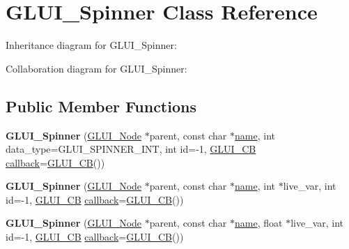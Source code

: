 \hypertarget{class_g_l_u_i___spinner}{\section{G\+L\+U\+I\+\_\+\+Spinner Class Reference}
\label{class_g_l_u_i___spinner}
}


Inheritance diagram for G\+L\+U\+I\+\_\+\+Spinner\+:


Collaboration diagram for G\+L\+U\+I\+\_\+\+Spinner\+:
\subsection*{Public Member Functions}
\begin{DoxyCompactItemize}
\item 
\hypertarget{class_g_l_u_i___spinner_a7a0a9950bfea2df037b2f13b21585d7b}{{\bfseries G\+L\+U\+I\+\_\+\+Spinner} (\hyperlink{class_g_l_u_i___node}{G\+L\+U\+I\+\_\+\+Node} $\ast$parent, const char $\ast$\hyperlink{class_g_l_u_i___control_aa95b97d50df45335fc33f0af03958eb3}{name}, int data\+\_\+type=G\+L\+U\+I\+\_\+\+S\+P\+I\+N\+N\+E\+R\+\_\+\+I\+N\+T, int id=-\/1, \hyperlink{class_g_l_u_i___c_b}{G\+L\+U\+I\+\_\+\+C\+B} \hyperlink{class_g_l_u_i___control_a96060fe0cc6d537e736dd6eef78e24ab}{callback}=\hyperlink{class_g_l_u_i___c_b}{G\+L\+U\+I\+\_\+\+C\+B}())}\label{class_g_l_u_i___spinner_a7a0a9950bfea2df037b2f13b21585d7b}

\item 
\hypertarget{class_g_l_u_i___spinner_afdb231b113e73b8714a36effcc9edf94}{{\bfseries G\+L\+U\+I\+\_\+\+Spinner} (\hyperlink{class_g_l_u_i___node}{G\+L\+U\+I\+\_\+\+Node} $\ast$parent, const char $\ast$\hyperlink{class_g_l_u_i___control_aa95b97d50df45335fc33f0af03958eb3}{name}, int $\ast$live\+\_\+var, int id=-\/1, \hyperlink{class_g_l_u_i___c_b}{G\+L\+U\+I\+\_\+\+C\+B} \hyperlink{class_g_l_u_i___control_a96060fe0cc6d537e736dd6eef78e24ab}{callback}=\hyperlink{class_g_l_u_i___c_b}{G\+L\+U\+I\+\_\+\+C\+B}())}\label{class_g_l_u_i___spinner_afdb231b113e73b8714a36effcc9edf94}

\item 
\hypertarget{class_g_l_u_i___spinner_ae1ea318b4c526ba0090a3989c3e87dfb}{{\bfseries G\+L\+U\+I\+\_\+\+Spinner} (\hyperlink{class_g_l_u_i___node}{G\+L\+U\+I\+\_\+\+Node} $\ast$parent, const char $\ast$\hyperlink{class_g_l_u_i___control_aa95b97d50df45335fc33f0af03958eb3}{name}, float $\ast$live\+\_\+var, int id=-\/1, \hyperlink{class_g_l_u_i___c_b}{G\+L\+U\+I\+\_\+\+C\+B} \hyperlink{class_g_l_u_i___control_a96060fe0cc6d537e736dd6eef78e24ab}{callback}=\hyperlink{class_g_l_u_i___c_b}{G\+L\+U\+I\+\_\+\+C\+B}())}\label{class_g_l_u_i___spinner_ae1ea318b4c526ba0090a3989c3e87dfb}


\end{DoxyCompactItemize}
